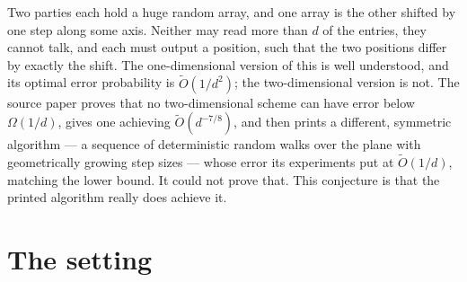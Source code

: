 \documentclass{aicr-conjecture}
\newcommand{\Ot}{\widetilde{O}}
\begin{document}

\vspace{0.4em}

\begin{informalconjecture}
Two parties each hold a huge random array, and one array is the other
shifted by one step along some axis. Neither may read more than $d$ of
the entries, they cannot talk, and each must output a position, such
that the two positions differ by exactly the shift. The one-dimensional
version of this is well understood, and its optimal error probability
is $\Ot(1/d^{2})$; the two-dimensional version is not. The source paper
proves that no two-dimensional scheme can have error below
$\Omega(1/d)$, gives one achieving $\Ot(d^{-7/8})$, and then prints a
different, symmetric algorithm --- a sequence of deterministic random
walks over the plane with geometrically growing step sizes --- whose
error its experiments put at $\Ot(1/d)$, matching the lower bound. It
could not prove that. This conjecture is that the printed algorithm
really does achieve it.
\end{informalconjecture}

\section{The setting}\label{sec:setting}
\end{document}
